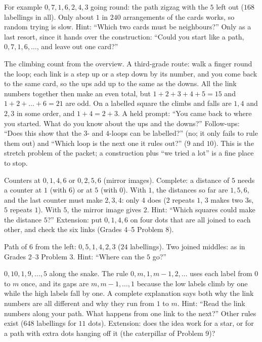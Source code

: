 For example $0,7,1,6,2,4,3$ going round: the path zigzag with the $5$ left out ($168$ labellings in all). Only about $1$ in $240$ arrangements of the cards works, so random trying is slow. Hint: ``Which two cards must be neighbours?'' Only as a last resort, since it hands over the construction: ``Could you start like a path, $0,7,1,6,\dots$, and leave out one card?''

The climbing count from the overview. A third-grade route: walk a finger round the loop; each link is a step up or a step down by its number, and you come back to the same card, so the ups add up to the same as the downs. All the link numbers together then make an even total, but $1+2+3+4+5=15$ and $1+2+\dots+6=21$ are odd. On a labelled square the climbs and falls are $1,4$ and $2,3$ in some order, and $1+4=2+3$. A held prompt: ``You came back to where you started. What do you know about the ups and the downs?'' Follow-ups: ``Does this show that the $3$- and $4$-loops can be labelled?'' (no; it only fails to rule them out) and ``Which loop is the next one it rules out?'' ($9$ and $10$). This is the stretch problem of the packet; a construction plus ``we tried a lot'' is a fine place to stop.

Counters at $0,1,4,6$ or $0,2,5,6$ (mirror images). Complete: a distance of $5$ needs a counter at $1$ (with $6$) or at $5$ (with $0$). With $1$, the distances so far are $1,5,6$, and the last counter must make $2,3,4$: only $4$ does ($2$ repeats $1$, $3$ makes two 3s, $5$ repeats $1$). With $5$, the mirror image gives $2$. Hint: ``Which squares could make the distance $5$?'' Extension: put $0,1,4,6$ on four dots that are all joined to each other, and check the six links (Grades 4--5 Problem 8).

Path of 6 from the left: $0,5,1,4,2,3$ ($24$ labellings). Two joined middles: as in Grades 2--3 Problem 3. Hint: ``Where can the $5$ go?''

$0,10,1,9,\dots,5$ along the snake. The rule $0,m,1,m-1,2,\dots$ uses each label from $0$ to $m$ once, and its gaps are $m,m-1,\dots,1$ because the low labels climb by one while the high labels fall by one. A complete explanation says both why the link numbers are all different and why they run from $1$ to $m$. Hint: ``Read the link numbers along your path. What happens from one link to the next?'' Other rules exist ($648$ labellings for $11$ dots). Extension: does the idea work for a star, or for a path with extra dots hanging off it (the caterpillar of Problem 9)?

